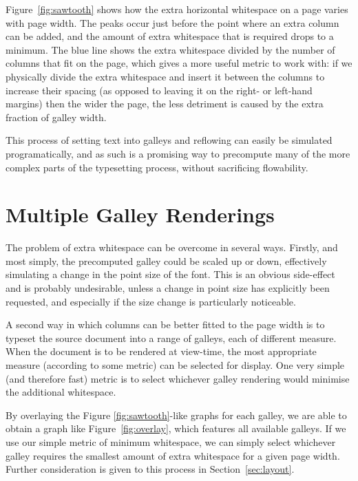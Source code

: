 Figure~\ref{fig:sawtooth} shows how the extra horizontal whitespace on a page varies with page width. The peaks occur just before the point where an extra column can be added, and the amount of extra whitespace that is required drops to a minimum. The blue line shows the extra whitespace divided by the number of columns that fit on the page, which gives a more useful metric to work with: if we physically divide the extra whitespace and insert it between the columns to increase their spacing (as opposed to leaving it on the right- or left-hand margins) then the wider the page, the less detriment is caused by the extra fraction of galley width.

This process of setting text into galleys and reflowing can easily be simulated programatically, and as such is a promising way to precompute many of the more complex parts of the typesetting process, without sacrificing flowability.

\section{Multiple Galley Renderings}
\label{sec:multigalleymetric}
The problem of extra whitespace can be overcome in several ways. Firstly, and most simply, the precomputed galley could be scaled up or down, effectively simulating a change in the point size of the font. This is an obvious side-effect and is probably undesirable, unless a change in point size has explicitly been requested, and especially if the size change is particularly noticeable.

A second way in which columns can be better fitted to the page width is to typeset the source document into a range of galleys, each of different \gls{measure}. When the document is to be rendered at view-time, the most appropriate measure (according to some metric) can be selected for display. One very simple (and therefore fast) metric is to select whichever galley rendering would minimise the additional whitespace.

By overlaying the Figure \mbox{\ref{fig:sawtooth}-like} graphs for each galley, we are able to obtain a graph like Figure~\ref{fig:overlay}, which features all available galleys. If we use our simple metric of minimum whitespace, we can simply select whichever galley requires the smallest amount of extra whitespace for a given page width. Further consideration is given to this process in Section~\ref{sec:layout}.

